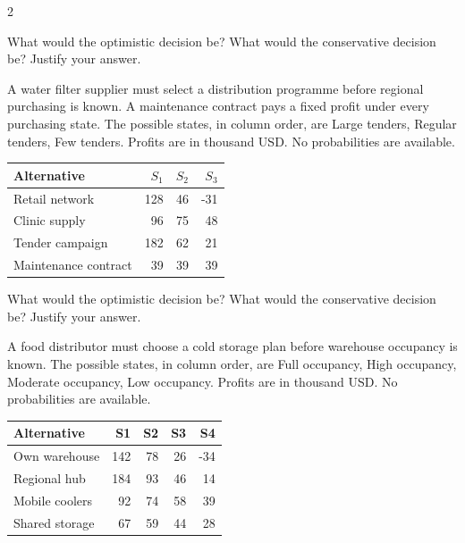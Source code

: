 \begin{multicols}{2}
\begin{minipage}{\linewidth}
What would the optimistic decision be? What would the conservative decision be? Justify your answer. 
\end{minipage}\par

\begin{minipage}{\linewidth}
A water filter supplier must select a distribution programme before regional purchasing is known. A maintenance contract pays a fixed profit under every purchasing state. The possible states, in column order, are Large tenders, Regular tenders, Few tenders. Profits are in thousand USD. No probabilities are available.
\begin{center}\small\setlength{\tabcolsep}{4pt}
\begin{tabular}{@{}lrrr@{}}\toprule
Alternative&$S_1$&$S_2$&$S_3$\\\midrule
Retail network&128&46&-31\\
Clinic supply&96&75&48\\
Tender campaign&182&62&21\\
Maintenance contract&39&39&39\\\bottomrule
\end{tabular}\end{center}

What would the optimistic decision be? What would the conservative decision be? Justify your answer. 
\end{minipage}\par

\begin{minipage}{\linewidth}
A food distributor must choose a cold storage plan before warehouse occupancy is known. The possible states, in column order, are Full occupancy, High occupancy, Moderate occupancy, Low occupancy. Profits are in thousand USD. No probabilities are available.
\begin{center}\small\setlength{\tabcolsep}{4pt}
\begin{tabular}{@{}lrrrr@{}}\toprule
Alternative&S1&S2&S3&S4\\\midrule
Own warehouse&142&78&26&-34\\
Regional hub&184&93&46&14\\
Mobile coolers&92&74&58&39\\
Shared storage&67&59&44&28\\\bottomrule
\end{tabular}\end{center}


\end{minipage}
\end{multicols}
